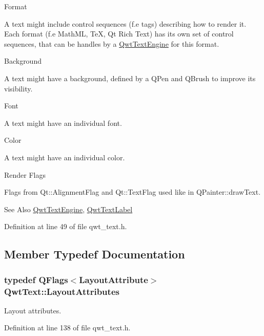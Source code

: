 \begin{DoxyItemize}
\item Format\par
 A text might include control sequences (f.\-e tags) describing how to render it. Each format (f.\-e Math\-M\-L, Te\-X, Qt Rich Text) has its own set of control sequences, that can be handles by a \hyperlink{class_qwt_text_engine}{Qwt\-Text\-Engine} for this format.
\item Background\par
 A text might have a background, defined by a Q\-Pen and Q\-Brush to improve its visibility.
\item Font\par
 A text might have an individual font.
\item Color\par
 A text might have an individual color.
\item Render Flags\par
 Flags from Qt\-::\-Alignment\-Flag and Qt\-::\-Text\-Flag used like in Q\-Painter\-::draw\-Text.
\end{DoxyItemize}

\begin{DoxySeeAlso}{See Also}
\hyperlink{class_qwt_text_engine}{Qwt\-Text\-Engine}, \hyperlink{class_qwt_text_label}{Qwt\-Text\-Label} 
\end{DoxySeeAlso}


Definition at line 49 of file qwt\-\_\-text.\-h.



\subsection{Member Typedef Documentation}
\hypertarget{class_qwt_text_aadd451b81d506c5bbefdddb8a100b9a3}{
\subsubsection[{Layout\-Attributes}]{\setlength{\rightskip}{0pt plus 5cm}typedef Q\-Flags$<${\bf Layout\-Attribute}$>$ {\bf Qwt\-Text\-::\-Layout\-Attributes}}}\label{class_qwt_text_aadd451b81d506c5bbefdddb8a100b9a3}


Layout attributes. 



Definition at line 138 of file qwt\-\_\-text.\-h.

